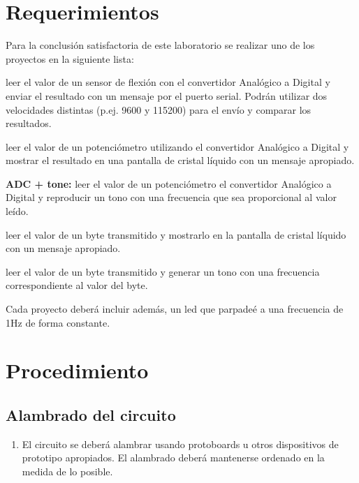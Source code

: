 \documentclass[12pt,letterpaper]{IEEEtran}
\begin{document}
\section{Requerimientos}

Para la conclusión satisfactoria de este laboratorio se realizar uno de los proyectos en la siguiente lista:

\begin{description}
	\item[\textbf{ADC + Serial:}] leer el valor de un sensor de flexión con el convertidor Analógico a Digital y enviar el resultado con un mensaje por el puerto serial. Podrán utilizar dos velocidades distintas (p.ej. 9600 y 115200) para el envío y comparar los resultados.\\
	\item[\textbf{ADC + LiquidCrystal:}] leer el valor de un potenciómetro utilizando el convertidor Analógico a Digital y mostrar el resultado en una pantalla de cristal líquido con un mensaje apropiado.\\
	\item{\textbf{ADC + tone:}} leer el valor de un potenciómetro el convertidor Analógico a Digital y reproducir un tono con una frecuencia que sea proporcional al valor leído. \\
	\item[\textbf{Serial + LCD:}] leer el valor de un byte transmitido y mostrarlo en la pantalla de cristal líquido con un mensaje apropiado.\\
	\item[\textbf{Serial + tone:}] leer el valor de un byte transmitido y generar un tono con una frecuencia correspondiente al valor del byte.\\  

\end{description}

Cada proyecto deberá incluir además, un led que parpadeé a una frecuencia de 1Hz de forma constante.

\section{Procedimiento}



\subsection{Alambrado del circuito}

\begin{enumerate}[resume]
	\item El circuito se deberá alambrar usando protoboards u otros dispositivos de prototipo apropiados. El alambrado deberá mantenerse ordenado en la medida de lo posible.
\end{enumerate}
\end{document}

